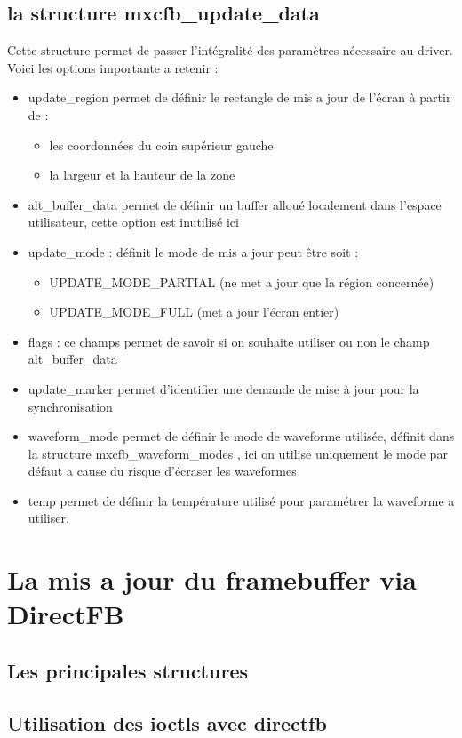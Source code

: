 \subsection{la structure mxcfb_update_data}
Cette structure permet de passer l'intégralité des paramètres nécessaire au driver.
Voici les options importante a retenir : 
\begin{itemize}
	\item update_region 
		permet de définir le rectangle de mis a jour de l'écran à partir de :
		\begin{itemize}
			\item les coordonnées du coin supérieur gauche
			\item la largeur et la hauteur de la zone
		\end{itemize}
	\item alt_buffer_data
		permet de définir un buffer alloué localement dans l'espace utilisateur, 
		cette option est inutilisé ici
		
	\item update_mode : 
		définit le mode de mis a jour peut être soit :
		\begin{itemize}
			\item UPDATE_MODE_PARTIAL (ne met a jour que la région concernée)
			\item UPDATE_MODE_FULL (met a jour l'écran entier)
		\end{itemize}
	\item flags : 
		ce champs permet de savoir si on souhaite utiliser ou non le champ alt_buffer_data
	\item update_marker
		permet d'identifier une demande de mise à jour pour la synchronisation
	\item waveform_mode 
		permet de définir le mode de waveforme utilisée, définit dans la structure
		mxcfb_waveform_modes , ici on utilise uniquement le mode par défaut a cause du risque 
		d'écraser les waveformes
	\item temp
		permet de définir la température utilisé pour paramétrer la waveforme a utiliser.
	
\end{itemize}


\section{La mis a jour du framebuffer via DirectFB}
\subsection{Les principales structures}
\subsection{Utilisation des ioctls avec directfb}